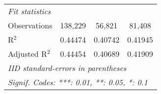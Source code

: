 \begin{tabular}{lccc}
   \emph{Fit statistics}\\
   Observations                    & 138,229                 & 56,821                  & 81,408\\  
   R$^2$                           & 0.44474                 & 0.40742                 & 0.41945\\  
   Adjusted R$^2$                  & 0.44454                 & 0.40689                 & 0.41909\\  
   \midrule \midrule
   \multicolumn{4}{l}{\emph{IID standard-errors in parentheses}}\\
   \multicolumn{4}{l}{\emph{Signif. Codes: ***: 0.01, **: 0.05, *: 0.1}}\\
\end{tabular}
\par\endgroup


